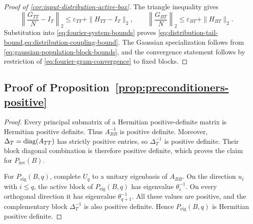 \begin{proof}[Proof of \cref{cor:input-distribution-active-box}]
The triangle inequality gives
\[
    \left\|\frac{G_{TT}}N-I_T\right\|_2
    \leq\varepsilon_{TT}+\|H_{TT}-I_T\|_2,
    \qquad
    \left\|\frac{G_{BT}}N\right\|_2
    \leq\varepsilon_{BT}+\|H_{BT}\|_2.
\]
Substitution into \cref{eq:fourier-system-bounds} proves
\cref{eq:distribution-tail-bound,eq:distribution-coupling-bound}. The
Gaussian specialization follows from
\cref{eq:gaussian-population-block-bounds}, and the convergence statement
follows by restriction of \cref{eq:fourier-gram-convergence} to fixed blocks.
\end{proof}

\subsection{Proof of Proposition~\ref{prop:preconditioners-positive}}
\label{app:proof-positive}

\begin{proof}
Every principal submatrix of a Hermitian positive-definite matrix is Hermitian
positive definite. Thus \(A_{BB}^{-1}\) is positive definite. Moreover,
\(\Delta_T=\operatorname{diag}(A_{TT})\) has strictly positive entries, so
\(\Delta_T^{-1}\) is positive definite. Their block diagonal combination is
therefore positive definite, which proves the claim for
\(P_{\mathrm{inv}}(B)\).

For \(P_{\mathrm{eig}}(B,q)\), complete \(U_q\) to a unitary eigenbasis of
\(A_{BB}\). On the direction \(u_i\) with \(i\leq q\), the active block of
\(P_{\mathrm{eig}}(B,q)\) has eigenvalue \(\theta_i^{-1}\). On every
orthogonal direction it has eigenvalue \(\theta_{q+1}^{-1}\). All these
values are positive, and the complementary block \(\Delta_T^{-1}\) is also
positive definite. Hence \(P_{\mathrm{eig}}(B,q)\) is Hermitian positive
definite.
\end{proof}

